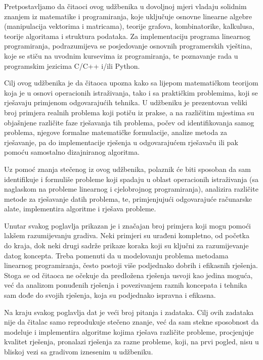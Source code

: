 \documentclass[a4paper, utf8, 11pt, colorlinks]{book}
\theoremstyle{definition}
\begin{document}
Pretpostavljamo da čitaoci ovog udžbenika u dovoljnoj mjeri vladaju solidnim znanjem iz matematike i programiranja, koje uključuje osnovne linearne algebre (manipulacija vektorima i matricama), teorije grafova, kombinatorike, kalkulusa, teorije algoritama i struktura podataka. Za implementaciju programa linearnog programiranja, podrazumijeva se posjedovanje osnovnih programerskih vještina, koje se stiču na uvodnim kursevima iz programiranja, te poznavanje rada u  programskim jezicima C/C++ i/ili Python. 

Cilj ovog udžbenika je da čitaoca upozna kako sa lijepom matematičkom teorijom koja je u osnovi operacionih istraživanja, tako i sa praktičkim problemima, koji se rješavaju primjenom odgovarajućih tehnika. U udžbeniku je prezentovan veliki broj primjera realnih problema koji potiču iz prakse, a na različitim mjestima su objašnjene različite faze rješavanja tih problema, počev od  identifikovanja samog problema, njegove formalne matematičke formulacije, analize  metoda za rješavanje, pa do implementacije rješenja u odgovarajućem rješavaču ili pak pomoću samostalno dizajniranog algoritma. 


Uz pomoć znanja stečenog iz ovog udžbenika, polaznik će biti sposoban da sam identifikuje i formuliše probleme koji spadaju u oblast operacionih istraživanja (sa naglaskom na probleme linearnog i cjelobrojnog programiranja), analizira različite metode za rješavanje datih problema, te, primjenjujući odgovarajuće računarske alate, implementira algoritme i rješava probleme.

Unutar svakog poglavlja prikazan je i značajan broj primjera koji mogu pomoći lakšem razumijevanju gradiva. Neki primjeri su urađeni kompletno, od početka do kraja, dok neki drugi sadrže prikaze koraka koji su klju\v cni za razumijevanje datog koncepta. Treba pomenuti da u modelovanju problema metodama linearnog programiranja, često postoji više podjednako dobrih i efikasnih rješenja. Stoga se od čitaoca ne očekuje da predložena rješenja usvoji kao jedina moguća, već da analizom ponuđenih rješenja i povezivanjem raznih koncepata i tehnika sam dođe do svojih rješenja, koja su podjednako ispravna i efikasna.

Na kraju svakog poglavlja dat je veći broj pitanja i zadataka. Cilj ovih zadataka nije da čitalac samo reprodukuje stečeno znanje, već da sam stekne sposobnost da modeluje i implementira algoritme kojima rješava različite probleme, procjenjuje kvalitet rješenja, pronalazi rješenja za razne probleme, koji, na prvi pogled, nisu u bliskoj vezi sa gradivom iznesenim u udžbeniku.
\end{document}
